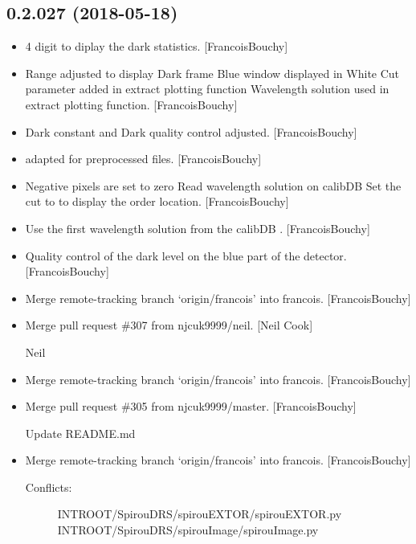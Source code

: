 \documentclass[a4paper,10pt,english]{report}
\begin{document}
\subsection{0.2.027 (2018-05-18)}
\label{\detokenize{misc/changelog:id435}}\begin{itemize}
\item {} 
4 digit to diplay the dark statistics. {[}FrancoisBouchy{]}

\item {} 
Range adjusted to display Dark frame Blue window displayed in White
Cut parameter added in extract plotting function Wavelength solution
used in extract plotting function. {[}FrancoisBouchy{]}

\item {} 
Dark constant and Dark quality control adjusted. {[}FrancoisBouchy{]}

\item {} 
 adapted for preprocessed files. {[}FrancoisBouchy{]}

\item {} 
Negative pixels are set to zero Read wavelength solution on calibDB
Set the cut to  to display the order location.
{[}FrancoisBouchy{]}

\item {} 
Use the first wavelength solution from the calibDB
. {[}FrancoisBouchy{]}

\item {} 
Quality control of the dark level on the blue part of the detector.
{[}FrancoisBouchy{]}

\item {} 
Merge remote-tracking branch ‘origin/francois’ into francois.
{[}FrancoisBouchy{]}

\item {} 
Merge pull request \#307 from njcuk9999/neil. {[}Neil Cook{]}

Neil

\item {} 
Merge remote-tracking branch ‘origin/francois’ into francois.
{[}FrancoisBouchy{]}

\item {} 
Merge pull request \#305 from njcuk9999/master. {[}FrancoisBouchy{]}

Update README.md

\item {} 
Merge remote-tracking branch ‘origin/francois’ into francois.
{[}FrancoisBouchy{]}
\begin{description}
\item[{Conflicts:}] \leavevmode
INTROOT/SpirouDRS/spirouEXTOR/spirouEXTOR.py
INTROOT/SpirouDRS/spirouImage/spirouImage.py

\end{description}

\end{itemize}
\end{document}
